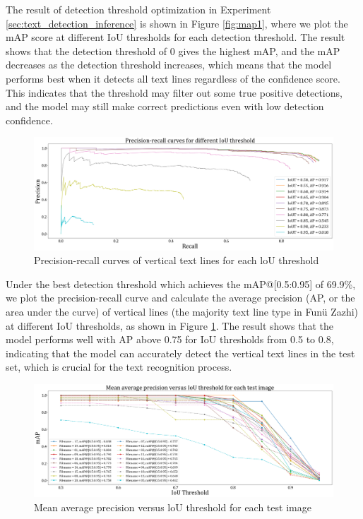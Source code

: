 \documentclass[12pt,twoside]{report}
\begin{document}
The result of detection threshold optimization in Experiment \ref{sec:text_detection_inference} is shown in Figure \ref{fig:map1}, where we plot the mAP score at different IoU thresholds for each detection threshold. The result shows that the detection threshold of 0 gives the highest mAP, and the mAP decreases as the detection threshold increases, which means that the model performs best when it detects all text lines regardless of the confidence score. This indicates that the threshold may filter out some true positive detections, and the model may still make correct predictions even with low detection confidence.

\begin{figure}[htbp]
    \centering
    \includegraphics[width=\textwidth]{./figures/map2.png}
    \caption{Precision-recall curves of vertical text lines for each loU threshold}
    \label{fig:map2}
\end{figure}

Under the best detection threshold which achieves the mAP@[0.5:0.95] of 69.9\%, we plot the precision-recall curve and calculate the average precision (AP, or the area under the curve) of vertical lines (the majority text line type in Funü Zazhi) at different IoU thresholds, as shown in Figure \ref{fig:map2}. The result shows that the model performs well with AP above 0.75 for IoU thresholds from 0.5 to 0.8, indicating that the model can accurately detect the vertical text lines in the test set, which is crucial for the text recognition process.

\begin{figure}[htbp]
    \centering
    \includegraphics[width=\textwidth]{./figures/map3.png}
    \caption{Mean average precision versus loU threshold for each test image}
    \label{fig:map3}
\end{figure}
\end{document}
